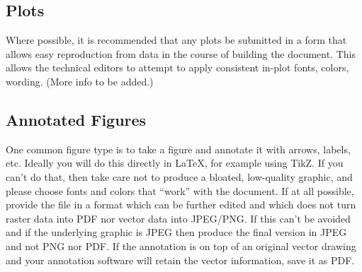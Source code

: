 \subsection{Plots}
\label{sec:plots}

Where possible, it is recommended that any plots be submitted in a
form that allows easy reproduction from data in the course of building
the document.
This allows the technical editors to attempt to apply consistent
in-plot fonts, colors, wording.
(More info to be added.)

\subsection{Annotated Figures}
\label{sec:annotate}

One common figure type is to take a figure and annotate it with
arrows, labels, etc.
Ideally you will do this directly in LaTeX, for example using TikZ.
If you can't do that, then take care not to produce a bloated,
low-quality graphic, and please choose fonts and colors that ``work''
with the document.
If at all possible, provide the file in a format which can be further
edited and which does not turn raster data into PDF nor vector data
into JPEG/PNG.
If this can't be avoided and if the underlying graphic is JPEG then
produce the final version in JPEG and not PNG nor PDF.
If the annotation is on top of an original vector drawing and your
annotation software will retain the vector information, save it as
PDF.

